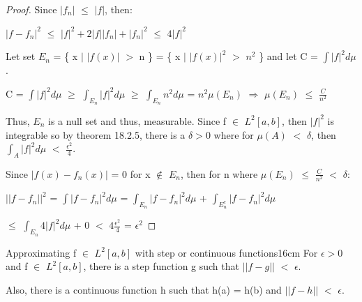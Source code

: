     \begin{proof}
        Since $|f_n|$ $\leq$ $|f|$, then:

        \hspace{0.5cm}
        $|f - f_n|^2$
        $\leq$ $|f|^2 + 2|f||f_n| + |f_n|^2$
        $\leq$ $4|f|^2$

        Let set $E_n$ = \{ x $|$ $|f(x)|$ $>$ n \}
        = \{ x $|$ $|f(x)|^2$ $>$ $n^2$ \} and let C = $\int |f|^2 d\mu$.

        \hspace{0.5cm}
        C = $\int |f|^2 d\mu$
        $\geq$ $\int_{E_n} |f|^2 d\mu$
        $\geq$ $\int_{E_n} n^2 d\mu$
        = $n^2 \mu(E_n)$
        \hspace{0.5cm}
        $\Rightarrow$
        \hspace{0.5cm}
        $\mu(E_n)$ $\leq$ $\frac{C}{n^2}$

        Thus, $E_n$ is a null set and thus, measurable.
        Since f $\in$ $L^2[a,b]$, then $|f|^2$ is integrable
        so by {\color{red} theorem 18.2.5}, there is a $\delta > 0$
        where for $\mu(A)$ $<$ $\delta$, then
        $\int_A |f|^2 d\mu$ $<$ $\frac{\epsilon^2}{4}$.
        
        Since $|f(x) - f_n(x)|$ = 0 for x $\not \in$ $E_n$,
        then for n where $\mu(E_n)$ $\leq$ $\frac{C}{n^2}$ $<$ $\delta$:

        \hspace{0.5cm}
        $||f - f_n||^2$
        = $\int |f - f_n|^2 d\mu$
        = $\int_{E_n} |f - f_n|^2 d\mu$
            + $\int_{E_n^c} |f - f_n|^2 d\mu$

        \hspace{2.4cm}
        $\leq$ $\int_{E_n} 4|f|^2 d\mu$ + 0
        $<$ $4\frac{\epsilon^2}{4}$
        = $\epsilon^2$
    \end{proof}

    \vspace{0.5cm}



    \begin{wtheorem}{Approximating f $\in$ $L^2[a,b]$ with step or continuous
    functions}{16cm}
        For $\epsilon > 0$ and f $\in$ $L^2[a,b]$, there is a step function
        g such that $||f-g||$ $<$ $\epsilon$.

        Also, there is a continuous function h such that h(a) = h(b) and
        $||f-h||$ $<$ $\epsilon$.
    \end{wtheorem}

